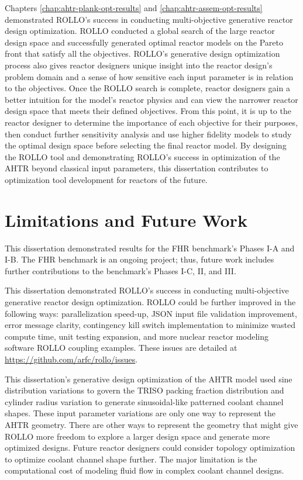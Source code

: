 Chapters \ref{chap:ahtr-plank-opt-results} and \ref{chap:ahtr-assem-opt-results} 
demonstrated \gls{ROLLO}'s success in conducting multi-objective generative reactor 
design optimization. 
\gls{ROLLO} conducted a global search of the large reactor design space and successfully 
generated optimal reactor models on the Pareto front that satisfy all the objectives. 
\gls{ROLLO}'s generative design optimization process also gives reactor designers 
unique insight into the reactor design's problem domain and a sense of how 
sensitive each input parameter is in relation to the objectives. 
Once the \gls{ROLLO} search is complete, reactor designers gain a better intuition for 
the model's reactor physics and can view the narrower reactor design space that meets 
their defined objectives.   
From this point, it is up to the reactor designer to determine the importance of each 
objective for their purposes, then conduct further sensitivity analysis and 
use higher fidelity models to study the optimal design space before selecting 
the final reactor model.
By designing the \gls{ROLLO} tool and demonstrating \gls{ROLLO}'s success in 
optimization of the \gls{AHTR} beyond classical input parameters, this dissertation 
contributes to optimization tool development for reactors of the future. 

\section{Limitations and Future Work}
This dissertation demonstrated results for the \gls{FHR} benchmark's Phases I-A and I-B.
The \gls{FHR} benchmark is an ongoing project; thus, future work includes further 
contributions to the benchmark's Phases I-C, II, and III. 

This dissertation demonstrated \gls{ROLLO}'s success in conducting multi-objective 
generative reactor design optimization. 
\gls{ROLLO} could be further improved in the following ways: parallelization speed-up, 
JSON input file validation improvement, error message clarity, contingency kill 
switch implementation to minimize wasted compute time, unit testing expansion, 
and more nuclear reactor modeling software \gls{ROLLO} coupling examples.  
These issues are detailed at \url{https://github.com/arfc/rollo/issues}.

This dissertation's generative design optimization of the \gls{AHTR} model used sine 
distribution variations to govern the \gls{TRISO} packing fraction distribution and  
cylinder radius variation to generate sinusoidal-like patterned coolant channel shapes. 
These input parameter variations are only one way to represent the \gls{AHTR} 
geometry. 
There are other ways to represent the geometry that might give \gls{ROLLO} more 
freedom to explore a larger design space and generate more optimized designs. 
Future reactor designers could consider topology optimization to optimize coolant 
channel shape further.
The major limitation is the computational cost of modeling fluid flow in complex 
coolant channel designs. 

